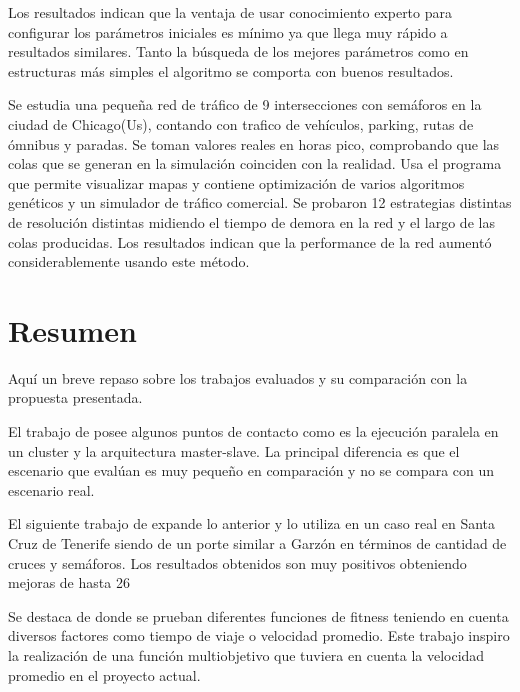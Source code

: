 \begin{itemize}
\begin{item}
Los resultados indican que la ventaja de usar conocimiento experto para configurar los parámetros iniciales es mínimo ya que llega muy rápido a resultados similares. Tanto la búsqueda de los mejores parámetros como en estructuras más simples el algoritmo se comporta con buenos resultados.
		
	\end{item}	
	
	\begin{item}

Se estudia una pequeña red de tráfico de 9 intersecciones con semáforos en la ciudad de Chicago(Us), contando con trafico de vehículos, parking, rutas de ómnibus y paradas.  
Se toman valores reales en horas pico, comprobando que las colas que se generan en la simulación coinciden con la realidad.
Usa el programa \citep{TRANSYT-7F} que permite visualizar mapas y contiene optimización de varios algoritmos genéticos 
 y \citep{CORSIM}  un simulador de tráfico comercial.
Se probaron 12 estrategias distintas de resolución distintas midiendo el tiempo de demora en la red y el largo de las colas producidas. Los resultados indican que la performance de la red aumentó considerablemente usando este método.	
	\end{item}	

\end{itemize}


\section{Resumen}
Aquí un breve repaso sobre los trabajos evaluados y su comparación con la propuesta presentada.

El trabajo de \citep{Sanchez2004} posee algunos puntos de contacto como es la ejecución paralela en un cluster y la arquitectura master-slave. La principal diferencia es que el escenario que evalúan es muy pequeño en comparación y no se compara con un escenario real.

El siguiente trabajo de \citep{Sanchez2008} expande lo anterior y lo utiliza en un caso real en Santa Cruz de Tenerife siendo de un porte similar a Garzón en términos de cantidad de cruces y semáforos. Los resultados obtenidos son muy positivos obteniendo mejoras de hasta 26%

Se destaca de \citep{Sanchez2010} donde se prueban diferentes funciones de fitness teniendo en cuenta diversos factores como tiempo de viaje o velocidad promedio. Este trabajo inspiro la realización de una función multiobjetivo que tuviera en cuenta la velocidad promedio en el proyecto actual.


